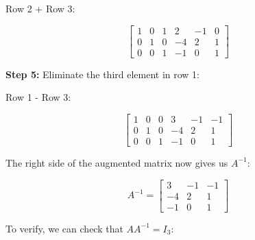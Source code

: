 Row 2 + Row 3:

\[
    \left[
    \begin{array}{ccc|ccc}
        1 & 0 & 1 & 2  & -1 & 0 \\
        0 & 1 & 0 & -4 & 2  & 1 \\
        0 & 0 & 1 & -1 & 0  & 1
    \end{array}
    \right]
\]

\textbf{Step 5:} Eliminate the third element in row 1:

Row 1 - Row 3:

\[
    \left[
    \begin{array}{ccc|ccc}
        1 & 0 & 0 & 3  & -1 & -1 \\
        0 & 1 & 0 & -4 & 2  & 1  \\
        0 & 0 & 1 & -1 & 0  & 1
    \end{array}
    \right]
\]

The right side of the augmented matrix now gives us \(A^{-1}\):

\[
    A^{-1} =
    \begin{bmatrix}
        3  & -1 & -1 \\
        -4 & 2  & 1  \\
        -1 & 0  & 1
    \end{bmatrix}
\]

To verify, we can check that \(AA^{-1} = I_3\):

